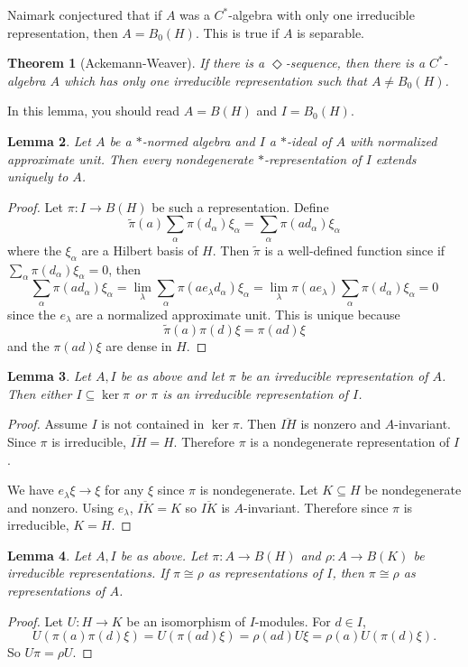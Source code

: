 \documentclass[12pt]{report}
\newtheorem{theorem}{Theorem}[chapter]
\newtheorem{lemma}[theorem]{Lemma}
\theoremstyle{definition}
\begin{document}
Naimark conjectured that if $A$ was a $C^*$-algebra with only one irreducible representation, then $A = B_0(H)$. This is true if $A$ is separable.
\begin{theorem}[Ackemann-Weaver]
    If there is a $\Diamond$-sequence, then there is a $C^*$-algebra $A$ which has only one irreducible representation such that $A \neq B_0(H)$.
\end{theorem}

In this lemma, you should read $A = B(H)$ and $I = B_0(H)$.
\begin{lemma}
    Let $A$ be a $*$-normed algebra and $I$ a $*$-ideal of $A$ with normalized approximate unit. Then every nondegenerate $*$-representation of $I$ extends uniquely to $A$.
\end{lemma}
\begin{proof}
    Let $\pi: I \to B(H)$ be such a representation. Define
    $$\tilde \pi(a) \sum_\alpha \pi(d_\alpha) \xi_\alpha = \sum_\alpha \pi(ad_\alpha) \xi_\alpha$$
    where the $\xi_\alpha$ are a Hilbert basis of $H$. Then $\tilde \pi$ is a well-defined function since if $\sum_\alpha \pi(d_\alpha)\xi_\alpha = 0$, then
    $$\sum_\alpha \pi(ad_\alpha)\xi_\alpha = \lim_\lambda \sum_\alpha \pi(ae_\lambda d_\alpha) \xi_\alpha = \lim_\lambda \pi(ae_\lambda) \sum_\alpha \pi(d_\alpha)\xi_\alpha = 0$$
    since the $e_\lambda$ are a normalized approximate unit. This is unique because
    $$\tilde \pi(a)\pi(d)\xi = \pi(ad)\xi$$
    and the $\pi(ad)\xi$ are dense in $H$.
\end{proof}

\begin{lemma}
    Let $A,I$ be as above and let $\pi$ be an irreducible representation of $A$. Then either $I \subseteq \ker\pi$ or $\pi$ is an irreducible representation of $I$.
\end{lemma}
\begin{proof}
    Assume $I$ is not contained in $\ker \pi$. Then $\overline{IH}$ is nonzero and $A$-invariant. Since $\pi$ is irreducible, $\overline{IH} =H$. Therefore $\pi$ is a nondegenerate representation of $I$.

    We have $e_\lambda\xi \to \xi$ for any $\xi$ since $\pi$ is nondegenerate. Let $K \subseteq H$ be nondegenerate and nonzero. Using $e_\lambda$, $\overline{IK} = K$ so $\overline{IK}$ is $A$-invariant. Therefore since $\pi$ is irreducible, $K = H$.
\end{proof}

\begin{lemma}
    Let $A,I$ be as above. Let $\pi: A \to B(H)$ and $\rho: A \to B(K)$ be irreducible representations. If $\pi \cong \rho$ as representations of $I$, then $\pi \cong \rho$ as representations of $A$.
\end{lemma}
\begin{proof}
    Let $U: H \to K$ be an isomorphism of $I$-modules. For $d \in I$,
    $$U(\pi(a)\pi(d)\xi) = U(\pi(ad)\xi) = \rho(ad)U\xi = \rho(a)U(\pi(d)\xi).$$
    So $U\pi = \rho U$.
\end{proof}
\end{document}

